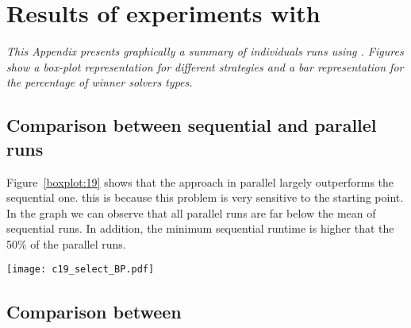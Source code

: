 \chapter{Results of experiments with \carrp}
\label{app:cap}
\textit{This Appendix presents graphically a summary of individuals runs using \carrp. Figures show a \textit{box-plot} representation for different strategies and a bar representation for the percentage of winner solvers types.}
\vfill
\newpage

\section{Comparison between sequential and parallel runs}

%

\begin{minipage}[c]{0.50\textwidth}
Figure~\ref{boxplot:19} shows that the approach in parallel largely outperforms the sequential one. this is because this problem is very sensitive to the starting point. In the graph we can observe that all parallel runs are far below the mean of sequential runs. In addition, the minimum sequential runtime is higher that the 50\% of the parallel runs.
\end{minipage}\hspace{0.05\textwidth}
\begin{minipage}[c]{0.40\textwidth}
\centering
\texttt{[image: c19\_select\_BP.pdf]}
\label{boxplot:19}
\end{minipage}

\section{Comparison between \commstrs}

